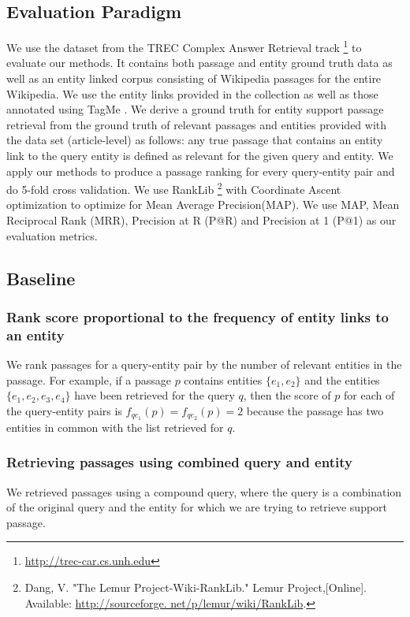 \documentclass[sigconf]{acmart}
\begin{document}
\subsection{Evaluation Paradigm}
\label{subsec:Evaluation Paradigm}
We use the dataset from the TREC Complex Answer Retrieval track \cite{dietztrec}\footnote{\url{http://trec-car.cs.unh.edu}} to evaluate our methods. It contains both passage and entity ground truth data as well as an entity linked corpus consisting of Wikipedia passages for the entire Wikipedia. We use the entity links provided in the collection as well as those annotated using TagMe \cite{ferragina2010tagme}. We derive a ground truth for entity support passage retrieval from the ground truth of relevant passages and entities provided with the data set (article-level) as follows: any true passage that contains an entity link to the query entity is defined as relevant for the given query and entity. We apply our methods to produce a passage ranking for every query-entity pair and do 5-fold cross validation. We use RankLib \footnote{Dang, V. "The Lemur Project-Wiki-RankLib." Lemur Project,[Online]. Available: \url{http://sourceforge. net/p/lemur/wiki/RankLib}.} with Coordinate Ascent
optimization to optimize for Mean Average Precision(MAP). We use MAP, Mean Reciprocal Rank (MRR), Precision at R (P@R) and Precision at 1 (P@1) as our evaluation metrics.   
\subsection{Baseline}
\label{subsec:Baseline}
\subsubsection{Rank score proportional to the frequency of entity links to an entity} 
\label{subsubsec: baseline 1}
We rank passages for a query-entity pair by the number of relevant entities in the passage. For example, if a passage $p$ contains entities $\{e_1,e_2\}$ and the entities $\{e_1,e_2,e_3,e_4\}$ have been retrieved for the query $q$, then the score of $p$ for each of the query-entity pairs is $f_{qe_1}(p)=f_{qe_2}(p)=2$ because the passage has two entities in common with the list retrieved for $q$.

\subsubsection{Retrieving passages using combined query and entity} 
\label{subsubsec: baseline 2}
We retrieved passages using a compound query, where the query is a combination of the original query and the entity for which we are trying to retrieve support passage.
 
\end{document}
